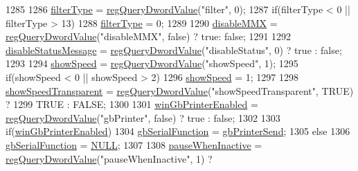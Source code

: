 \begin{DoxyCode}
1285 
1286   \mbox{\hyperlink{class_v_b_a_a835f54f74420b21459e0f3ce0eacc20d}{filterType}} = \mbox{\hyperlink{_reg_8cpp_a150640889ffff4851ee26d7b999ec7c3}{regQueryDwordValue}}(\textcolor{stringliteral}{"filter"}, 0);
1287   \textcolor{keywordflow}{if}(filterType < 0 || filterType > 13)
1288     \mbox{\hyperlink{class_v_b_a_a835f54f74420b21459e0f3ce0eacc20d}{filterType}} = 0;
1289 
1290   \mbox{\hyperlink{class_v_b_a_ac417f46c467d0fcf095731620ca7de71}{disableMMX}} = \mbox{\hyperlink{_reg_8cpp_a150640889ffff4851ee26d7b999ec7c3}{regQueryDwordValue}}(\textcolor{stringliteral}{"disableMMX"}, \textcolor{keyword}{false}) ? \textcolor{keyword}{true}: \textcolor{keyword}{false};
1291 
1292   \mbox{\hyperlink{class_v_b_a_a7bfea5ab60b19d26053b22ce070e2248}{disableStatusMessage}} = \mbox{\hyperlink{_reg_8cpp_a150640889ffff4851ee26d7b999ec7c3}{regQueryDwordValue}}(\textcolor{stringliteral}{"disableStatus"}, 0) ? 
      true : \textcolor{keyword}{false};
1293 
1294   \mbox{\hyperlink{class_v_b_a_ad86589d0d03fceef36d35c0b2e928e9e}{showSpeed}} = \mbox{\hyperlink{_reg_8cpp_a150640889ffff4851ee26d7b999ec7c3}{regQueryDwordValue}}(\textcolor{stringliteral}{"showSpeed"}, 1);
1295   \textcolor{keywordflow}{if}(showSpeed < 0 || showSpeed > 2)
1296     \mbox{\hyperlink{class_v_b_a_ad86589d0d03fceef36d35c0b2e928e9e}{showSpeed}} = 1;
1297 
1298   \mbox{\hyperlink{class_v_b_a_a0a2ca5a7091f9c79b39ea0916dd88a05}{showSpeedTransparent}} = \mbox{\hyperlink{_reg_8cpp_a150640889ffff4851ee26d7b999ec7c3}{regQueryDwordValue}}(\textcolor{stringliteral}{"showSpeedTransparent"}, 
      TRUE) ?
1299     TRUE : FALSE;
1300 
1301   \mbox{\hyperlink{class_v_b_a_ad02c13c4fea97781a17ca6c9f9cdaa49}{winGbPrinterEnabled}} = \mbox{\hyperlink{_reg_8cpp_a150640889ffff4851ee26d7b999ec7c3}{regQueryDwordValue}}(\textcolor{stringliteral}{"gbPrinter"}, \textcolor{keyword}{false}) ? true 
      : \textcolor{keyword}{false};
1302 
1303   \textcolor{keywordflow}{if}(\mbox{\hyperlink{class_v_b_a_ad02c13c4fea97781a17ca6c9f9cdaa49}{winGbPrinterEnabled}})
1304     \mbox{\hyperlink{gb_globals_8cpp_a824d706a8d4285ee024bfd05a69e47e4}{gbSerialFunction}} = \mbox{\hyperlink{gb_printer_8cpp_ad92e246f72a463f50f3c0856418e087e}{gbPrinterSend}};
1305   \textcolor{keywordflow}{else}
1306     \mbox{\hyperlink{gb_globals_8cpp_a824d706a8d4285ee024bfd05a69e47e4}{gbSerialFunction}} = \mbox{\hyperlink{getopt1_8c_a070d2ce7b6bb7e5c05602aa8c308d0c4}{NULL}};  
1307 
1308   \mbox{\hyperlink{class_v_b_a_a77e9763291376839d4c1e5eff00604b5}{pauseWhenInactive}} = \mbox{\hyperlink{_reg_8cpp_a150640889ffff4851ee26d7b999ec7c3}{regQueryDwordValue}}(\textcolor{stringliteral}{"pauseWhenInactive"}, 1) ?

\end{DoxyCode}
